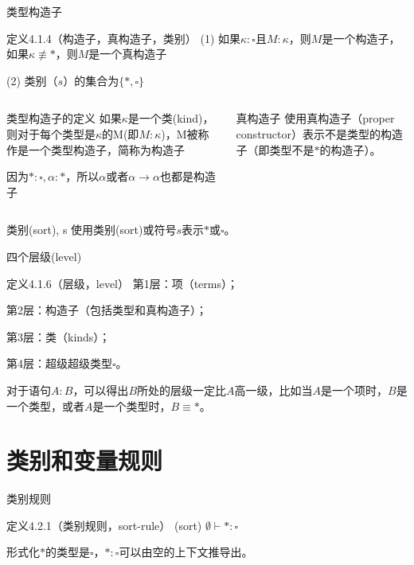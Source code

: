 \documentclass[UTF8,aspectratio=169,mathserif]{beamer}
\begin{document}
		\begin{frame}[shrink]{类型构造子}
			\begin{exampleblock}{定义4.1.4（构造子，真构造子，类别）}
				(1) 如果$\kappa:\square$且$M:\kappa$，则$M$是一个构造子，如果$\kappa\not\equiv*$，则$M$是一个真构造子
				
				(2) 类别（$s$）的集合为$\{*,\square\}$
			\end{exampleblock}
			\begin{columns}
				\begin{column}{0.48\textwidth}
					\begin{block}{类型构造子的定义}
						如果$\kappa$是一个类(kind)，则对于每个类型是$\kappa$的M(即$M:\kappa$)，M被称作是一个类型构造子，简称为构造子
						
						因为$*:\square,\alpha:*$，所以$\alpha$或者$\alpha\rightarrow\alpha$也都是构造子
					\end{block}
				\end{column}
				\begin{column}{0.475\textwidth}
					\begin{block}{真构造子}
						使用真构造子（proper constructor）表示不是类型的构造子（即类型不是$*$的构造子）。
					\end{block}
				\end{column}
			\end{columns}
			\begin{block}{类别(sort), s}
				使用类别(sort)或符号$s$表示$*$或$\square$。
			\end{block}
		\end{frame}
	
		\begin{frame}{四个层级(level)}
			\begin{exampleblock}{定义4.1.6（层级，level）}
				第1层：项（terms）；
				
				第2层：构造子（包括类型和真构造子）；
				
				第3层：类（kinds）；
				
				第4层：超级超级类型$\square$。
			\end{exampleblock}
		
			对于语句$A:B$，可以得出$B$所处的层级一定比$A$高一级，比如当$A$是一个项时，$B$是一个类型，或者$A$是一个类型时，$B\equiv*$。
		\end{frame}

	\section{类别和变量规则}
		\begin{frame}{类别规则}
			\begin{exampleblock}{定义4.2.1（类别规则，sort-rule）}
				(sort) $\emptyset \vdash *:\square$
			\end{exampleblock}
		
			形式化$*$的类型是$\square$，$*:\square$可以由空的上下文推导出。
		\end{frame}
	
\end{document}
